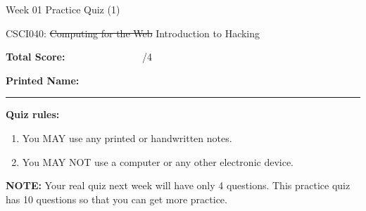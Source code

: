 \documentclass[10pt]{article}
\theoremstyle{definition}
\begin{document}
\begin{center}
    {
\Large
Week 01 Practice Quiz (1)
}

    \vspace{0.1in}
    CSCI040: \sout{Computing for the Web} Introduction to Hacking

    \vspace{0.1in}
\end{center}

\vspace{0.15in}
\noindent
\textbf{Total Score:} ~~~~~~~~~~~~~~~/4

\vspace{0.5in}
\noindent
\textbf{Printed Name:}

\noindent
\rule{\textwidth}{0.1pt}
\vspace{0.25in}

\noindent
\textbf{Quiz rules:}
\begin{enumerate}
    \item You MAY use any printed or handwritten notes.
    \item You MAY NOT use a computer or any other electronic device.
\end{enumerate}

\noindent
\textbf{NOTE:}
Your real quiz next week will have only 4 questions.
This practice quiz has 10 questions so that you can get more practice.

\vspace{0.15in}
\end{document}
